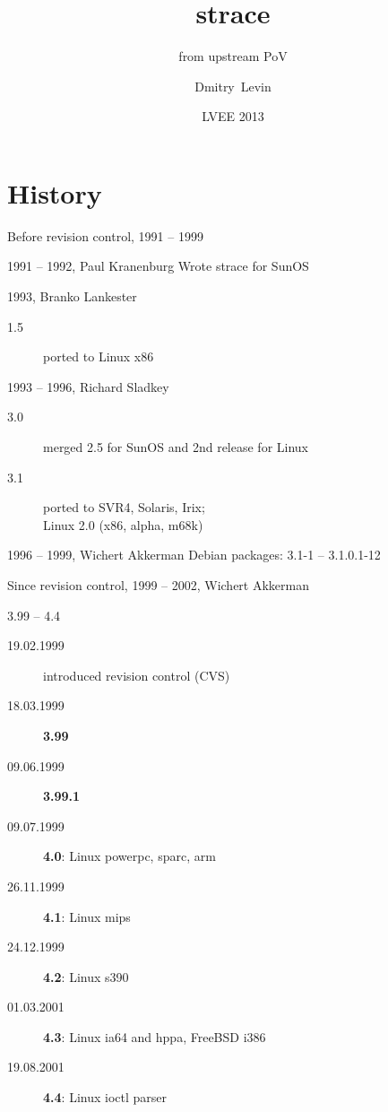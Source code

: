 \documentclass[unicode]{beamer}
\title{\Huge strace}
\subtitle{\Huge from upstream PoV}
\author{\Huge Dmitry~Levin}
\date{\Huge LVEE 2013}
\begin{document}
\begin{frame}
	\titlepage
\end{frame}

\section{History}

\begin{frame}{Before revision control, 1991 -- 1999}
	\begin{block}{1991 -- 1992, Paul Kranenburg}
	Wrote strace for SunOS
	\end{block}
	\begin{block}{1993, Branko Lankester}
	\begin{description}
		\item[1.5] ported to Linux x86
	\end{description}
	\end{block}
	\begin{block}{1993 -- 1996, Richard Sladkey}
	\begin{description}
		\item[3.0] merged 2.5 for SunOS and 2nd release for Linux
		\item[3.1] ported to SVR4, Solaris, Irix; \\ Linux 2.0 (x86, alpha, m68k)
	\end{description}
	\end{block}
	\begin{block}{1996 -- 1999, Wichert Akkerman}
		Debian packages: 3.1-1 -- 3.1.0.1-12
	\end{block}
\end{frame}

\begin{frame}{Since revision control, 1999 -- 2002, Wichert Akkerman}
	\begin{block}{3.99 -- 4.4}
	\begin{description}
		\item[19.02.1999] introduced revision control (CVS)
		\item[18.03.1999] {\bf 3.99}
		\item[09.06.1999] {\bf 3.99.1}
		\item[09.07.1999] {\bf 4.0}: Linux powerpc, sparc, arm
		\item[26.11.1999] {\bf 4.1}: Linux mips
		\item[24.12.1999] {\bf 4.2}: Linux s390
		\item[01.03.2001] {\bf 4.3}: Linux ia64 and hppa, FreeBSD i386
		\item[19.08.2001] {\bf 4.4}: Linux ioctl parser
	\end{description}
	\end{block}
\end{frame}
\end{document}
